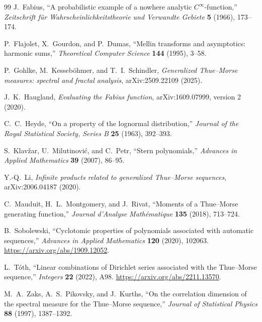 \documentclass[11pt,a4paper,oneside,openany]{book}
\numberwithin{equation}{chapter}
\theoremstyle{definition}
\theoremstyle{remark}
\begin{document}
\begin{thebibliography}{99}
J.~Fabius, ``A probabilistic example of a nowhere analytic
$C^\infty$-function,'' \emph{Zeitschrift f\"ur Wahrscheinlichkeitstheorie
und Verwandte Gebiete} \textbf{5} (1966), 173--174.

P.~Flajolet, X.~Gourdon, and P.~Dumas, ``Mellin transforms and asymptotics:
harmonic sums,'' \emph{Theoretical Computer Science} \textbf{144} (1995),
3--58.

P.~Gohlke, M.~Kesseb\"ohmer, and T.~I.~Schindler, \emph{Generalized
Thue--Morse measures: spectral and fractal analysis}, arXiv:2509.22109
(2025).

J.~K.~Haugland, \emph{Evaluating the Fabius function}, arXiv:1609.07999,
version 2 (2020).

C.~C.~Heyde, ``On a property of the lognormal distribution,''
\emph{Journal of the Royal Statistical Society, Series B} \textbf{25} (1963),
392--393.

S.~Klav\v zar, U.~Milutinovi\'c, and C.~Petr, ``Stern polynomials,''
\emph{Advances in Applied Mathematics} \textbf{39} (2007), 86--95.

Y.-Q.~Li, \emph{Infinite products related to generalized Thue--Morse
sequences}, arXiv:2006.04187 (2020).

C.~Mauduit, H.~L.~Montgomery, and J.~Rivat, ``Moments of a Thue--Morse
generating function,'' \emph{Journal d'Analyse Math\'ematique} \textbf{135}
(2018), 713--724.

B.~Sobolewski, ``Cyclotomic properties of polynomials associated with
automatic sequences,'' \emph{Advances in Applied Mathematics} \textbf{120}
(2020), 102063. \url{https://arxiv.org/abs/1909.12052}.

L.~T\'oth, ``Linear combinations of Dirichlet series associated with the
Thue--Morse sequence,'' \emph{Integers} \textbf{22} (2022), A98.
\url{https://arxiv.org/abs/2211.13570}.

M.~A.~Zaks, A.~S.~Pikovsky, and J.~Kurths, ``On the correlation dimension of
the spectral measure for the Thue--Morse sequence,'' \emph{Journal of
Statistical Physics} \textbf{88} (1997), 1387--1392.

\end{thebibliography}
\end{document}
